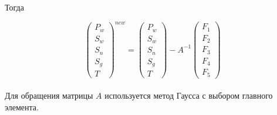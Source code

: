 Тогда

\begin{equation}
\begin{pmatrix}
P_w\\
S_w\\
S_n\\
S_g\\
T
\end{pmatrix}^{new}
=
\begin{pmatrix}
P_w\\
S_w\\
S_n\\
S_g\\
T
\end{pmatrix}
-A^{-1}
\begin{pmatrix}
F_1\\
F_2\\
F_3\\
F_4\\
F_5
\end{pmatrix}
\end{equation}\\

Для обращения матрицы $A$ используется метод Гаусса с выбором
главного элемента\cite{Kalitkin}.
